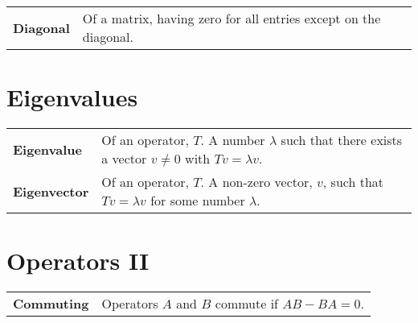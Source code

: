 \documentclass[10pt, a4paper, landscape]{article}
\newcommand{\defn}[1]{\textbf{#1}}
\begin{document}
\begin{multicols*}{3}
\begin{tabularx}{\columnwidth}{@{}l>{\raggedright\arraybackslash}X@{}}
  \defn{Diagonal} & Of a matrix, having zero for all entries except on the diagonal.
                                                     
                
\end{tabularx}


\section*{Eigenvalues}
\begin{tabularx}{\columnwidth}{@{}l>{\raggedright\arraybackslash}X@{}}
  \toprule
  \defn{Eigenvalue} &
                      Of an operator, $T$. A number $\lambda$ such that there exists a vector $v\neq 0$ with $Tv=\lambda v$. 
  \\
  \defn{Eigenvector} &
                       Of an operator, $T$. A non-zero vector, $v$, such that $Tv=\lambda v$ for some number $\lambda$.
  \\

\end{tabularx}


\section*{Operators II}
\begin{tabularx}{\columnwidth}{@{}l>{\raggedright\arraybackslash}X@{}}
  \toprule
  \defn{Commuting} & Operators $A$ and $B$ commute if $AB-BA=0$. 
\end{tabularx}



\end{multicols*}
\end{document}
